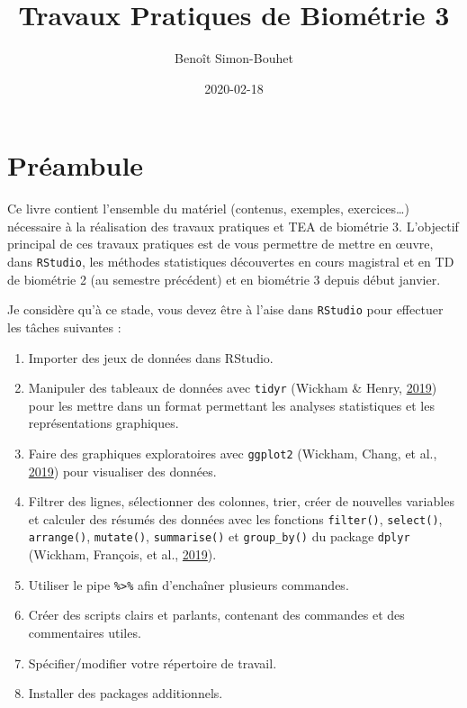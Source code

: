 \documentclass[a4paperpaper,]{article}
\title{Travaux Pratiques de Biométrie 3}
\author{Benoît Simon-Bouhet}
\date{2020-02-18}
\providecommand{\tightlist}{%
  \setlength{\itemsep}{0pt}\setlength{\parskip}{0pt}}
\begin{document}
\maketitle

{
\hypersetup{linkcolor=black}
\setcounter{tocdepth}{2}
\tableofcontents
}
\hypertarget{pruxe9ambule}{%
\section{Préambule}\label{pruxe9ambule}}

Ce livre contient l'ensemble du matériel (contenus, exemples, exercices\ldots{}) nécessaire à la réalisation des travaux pratiques et TEA de biométrie 3. L'objectif principal de ces travaux pratiques est de vous permettre de mettre en œuvre, dans \texttt{RStudio}, les méthodes statistiques découvertes en cours magistral et en TD de biométrie 2 (au semestre précédent) et en biométrie 3 depuis début janvier.

Je considère qu'à ce stade, vous devez être à l'aise dans \texttt{RStudio} pour effectuer les tâches suivantes :

\begin{enumerate}
\def\labelenumi{\arabic{enumi}.}
\tightlist
\item
  Importer des jeux de données dans RStudio.
\item
  Manipuler des tableaux de données avec \texttt{tidyr} (Wickham \& Henry, \protect\hyperlink{ref-R-tidyr}{2019}) pour les mettre dans un format permettant les analyses statistiques et les représentations graphiques.
\item
  Faire des graphiques exploratoires avec \texttt{ggplot2} (Wickham, Chang, et al., \protect\hyperlink{ref-R-ggplot2}{2019}) pour visualiser des données.
\item
  Filtrer des lignes, sélectionner des colonnes, trier, créer de nouvelles variables et calculer des résumés des données avec les fonctions \texttt{filter()}, \texttt{select()}, \texttt{arrange()}, \texttt{mutate()}, \texttt{summarise()} et \texttt{group\_by()} du package \texttt{dplyr} (Wickham, François, et al., \protect\hyperlink{ref-R-dplyr}{2019}).
\item
  Utiliser le pipe \texttt{\%\textgreater{}\%} afin d'enchaîner plusieurs commandes.
\item
  Créer des scripts clairs et parlants, contenant des commandes et des commentaires utiles.
\item
  Spécifier/modifier votre répertoire de travail.
\item
  Installer des packages additionnels.
\end{enumerate}
\end{document}
